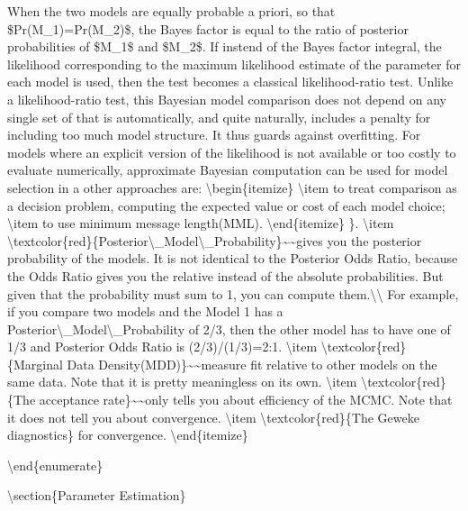 \documentclass[10pt,math=newtx,citestyle=gb7714-2015,bibstyle=gb7714-2015]{elegantbook}
\begin{document}
	When the two models are equally probable a priori, so that \$Pr(M\_1)=Pr(M\_2)\$, the Bayes factor is equal to the ratio of posterior probabilities of \$M\_1\$ and \$M\_2\$. If instend of the Bayes factor integral, the likelihood corresponding to the maximum likelihood estimate of the parameter for each model is used, then the test becomes a classical likelihood-ratio test. Unlike a likelihood-ratio test, this Bayesian model comparison does not depend on any single set of that is automatically, and quite naturally, includes a penalty for including too much model structure. It thus guards against overfitting. For models where an explicit version of the likelihood is not available or too costly to evaluate numerically, approximate Bayesian computation can be used for model selection in a other approaches are:
	\textbackslash{}begin\{itemize\}
	\textbackslash{}item to treat comparison as a decision problem, computing the expected value or cost of each model choice;
	\textbackslash{}item to use minimum message length(MML).
	\textbackslash{}end\{itemize\}
	\}.
	\textbackslash{}item \textbackslash{}textcolor\{red\}\{Posterior\textbackslash{}\_Model\textbackslash{}\_Probability\}\~{}\~{}gives you the posterior probability of the models. It is not identical to the Posterior Odds Ratio, because the Odds Ratio gives you the relative instead of the absolute probabilities. But given that the probability must sum to 1, you can compute them.\textbackslash{}\textbackslash{}
	For example, if you compare two models and the Model 1 has a Posterior\textbackslash{}\_Model\textbackslash{}\_Probability of 2/3, then the other model has to have one of 1/3 and Posterior Odds Ratio is (2/3)/(1/3)=2:1.
	\textbackslash{}item \textbackslash{}textcolor\{red\}\{Marginal Data Density(MDD)\}\~{}\~{}measure fit relative to other models on the same data. Note that it is pretty meaningless on its own.
	\textbackslash{}item \textbackslash{}textcolor\{red\}\{The acceptance rate\}\~{}\~{}only tells you about efficiency of the MCMC. Note that it does not tell you about convergence.
	\textbackslash{}item \textbackslash{}textcolor\{red\}\{The Geweke diagnostics\} for convergence.
	\textbackslash{}end\{itemize\}
	
	\textbackslash{}end\{enumerate\}
	
	\textbackslash{}section\{Parameter Estimation\}
	
\end{document}
